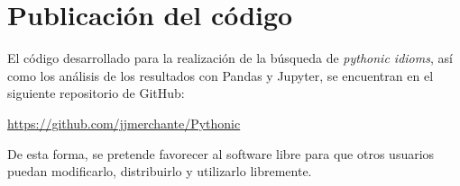 \documentclass[a4paper, 12pt]{book}
\begin{document}
\chapter{Publicación del código}  
\label{app:urlcode}

El código desarrollado para la realización de la búsqueda de \textit{pythonic idioms}, así como los análisis de los resultados con Pandas y Jupyter, se encuentran en el siguiente repositorio de GitHub:

\url{https://github.com/jjmerchante/Pythonic}

De esta forma, se pretende favorecer al software libre para que otros usuarios puedan modificarlo, distribuirlo y utilizarlo libremente.






\cleardoublepage


\end{document}
